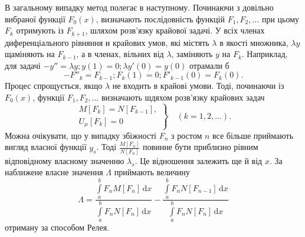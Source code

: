 \documentclass[12pt,a4paper]{article}
\begin{document}
В загальному випадку метод полегає в наступному. Починаючи з довільно вибраної функції $F_0(x)$, визначають послідовність функцій $F_1, F_2, \dots$ при цьому $F_k$ отримують із $F_{k+1}$, шляхом розв'язку крайової задачі. У всіх членах диференціального рівняння и крайових умов, які містять $\lambda$ в якості множника, $\lambda y$ щаміняють на $F_{k-1}$, а в членах, вільних від $\lambda$, заміняють $y$ на $F_k$. Наприклад, для задачі $- y'' = \lambda y; y(1) = 0; \lambda y'(0) = y(0)$ отрамали б
\[
	- F''_k = F_{k-1}; F_k(1) = 0; F'_{k-1}(0) = F_k(0).
\] 
Процес спрощується, якщо $\lambda$ не входить в крайові умови. Тоді, починаючи із $F_0(x)$, функції $F_1, F_2, \dots$ визначають шдяхом розв'язку крайових задач
\[
\left.
\begin{array}{l}
	M[F_k] = N[F_{k-1}],\\
	U_\mu[F_k] = 0
\end{array} \right\}
\quad
(k = 1, 2, \dots).
\]
Можна очікувати, що у випадку збіжності $F_n$ з ростом $n$ все більше приймають вигляд власної функції $y_s$. Тоді $\frac{M[F_n]}{N[F_n]}$ повинне бути приблизно рівним відповідному власному значенню $\lambda_s$. Це відношення залежить ще й від $x$. За наближене власне значення $\Lambda$ приймають величину
\[
\Lambda = \frac{\int\limits_a^b F_n M[F_n]\,\mathrm{d}x}
			   {\int\limits_a^b F_n N[F_n]\,\mathrm{d}x}
		  -
		  \frac{\int\limits_a^b F_n N[F_{n-1}]\,\mathrm{d}x}
			   {\int\limits_a^b F_n N[F_n]\,\mathrm{d}x}
\]
отриману за способом Релея.
\end{document}
